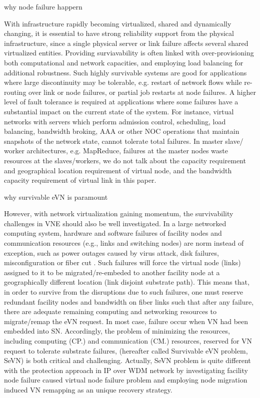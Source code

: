why node failure happern

With infrastructure rapidly becoming virtualized, shared and dynamically changing, it is essential to have strong reliability support from the physical infrastructure, since a single physical server or link failure affects several shared virtualized entities. Providing surviavability is often linked with over-provisioning both computational and network capacities, and employing load balancing for additional robustness. Such highly survivable systems are good for applications where large discontinuity may be tolerable, e.g. restart of network flows while re-routing over link or node failures, or partial job restarts at node failures. A higher level of fault tolerance is required at applications where some failures have a substantial impact on the current state of the system. For instance, virtual networks with servers which perform admission control, scheduling, load balancing, bandwidth broking, AAA or other NOC operations that maintain snapshots of the network state, cannot tolerate total failures. In master slave/ worker architectures, e.g. MapReduce, failures at the master nodes waste resources at the slaves/workers, we do not talk about the capacity requirement and geographical location requirement of virtual node, and the bandwidth capacity requirement of virtual link in this paper.


why survivable eVN is paramount

However, with network virtualization gaining momentum, the survivability challenges in VNE should also be well investigated. In a large networked computing system, hardware and software failures of facility nodes and communication resources (e.g., links and switching nodes) are norm instead of exception, such as power outages caused by virus attack, disk failures, misconfiguration or fiber cut \cite{xu2012survivable,rahman2010survivable,rahman2013svne,guo2011shared,chen2010resilient}. Such failures will force the virtual node (links) assigned to it to be migrated/re-embeded to another facility node at a geographically different location (link disjoint substrate path). This means that, in order to survive from the disruptions due to such failures, one must reserve redundant facility nodes and bandwidth on fiber links such that after any failure, there are adequate remaining computing and networking resources to migrate/remap the eVN request. In most case, failure occur when VN had been embedded into SN. Accordingly, the problem of minimizing the resources, including computing (CP.) and communication (CM.) resources, reserved for VN request to tolerate substrate failures, (hereafter called Survivable eVN problem, SeVN) is both critical and challenging. Actually, SeVN problem is quite different with the protection approach
in IP over WDM network by investigating facility node failure caused virtual node failure problem and employing node migration induced VN remapping as an unique recovery strategy.


